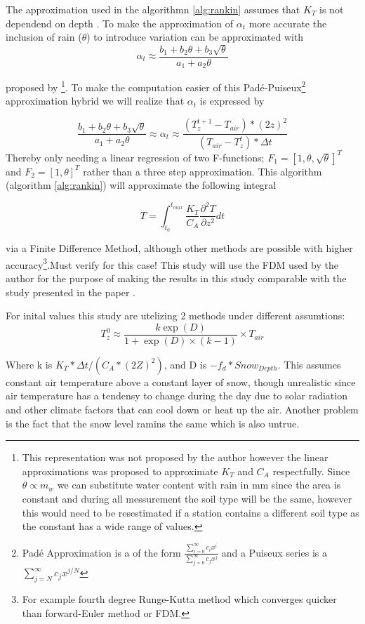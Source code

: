 The approximation used in the algorithmn \ref{alg:rankin} assumes that $K_T$ is not dependend on depth . To make the approximation of $\alpha_t$ more accurate the inclusion of rain ($\theta$) to introduce variation can be approximated with
$$
\alpha_t \approx \frac{b_1 + b_2\theta +b_3\sqrt{\theta}}{a_1 + a_2\theta}
$$

proposed by \citeauthor{kodesova_thermal_2013}\cite{kodesova_thermal_2013}\footnote{This representation was not proposed by the author however the linear approximations was proposed to approximate $K_T$ and $C_A$ respectfully. Since $\theta \propto m_w$ we can substitute water content with rain in mm since the area is constant and during all messurement the soil type will be the same, however this would need to be resestimated if a station contains a different soil type as the constant has a wide range of values\cite{kodesova_thermal_2013}.}. To make the computation easier of this Padé-Puiseux\footnote{Padé Approximation is a of the form $\frac{\sum_{i=0}^\infty c_ix^i}{\sum_{j=0}^\infty c_jx^j}$ and a Puiseux series is a $\sum_{j=N}^\infty c_jx^{j/N}$} approximation hybrid we will realize that $\alpha_t$ is expressed by

$$
	\frac{b_1 + b_2\theta +b_3\sqrt{\theta}}{a_1 + a_2\theta} \approx \alpha_t \approx \frac{(T_z^{t+1} - T_{air})*(2z)^2}{( T_{air} - T_z^{t})*\Delta t} 
$$
Thereby only needing a linear regression of two F-functions; $F_1 = [ 1,\theta ,\sqrt{\theta} ]^T$ and $F_2 = [1 , \theta]^T$ rather than a three step approximation. This algorithm (algorithm \ref{alg:rankin}) will approximate the following integral

$$
T = \int_{t_0}^{t_{max}} \frac{K_T}{C_A}\frac{\partial^2 T}{\partial z^2} dt
$$

via a Finite Difference Method, although other methods are possible with higher accuracy\footnote{For example fourth degree Runge-Kutta method\cite{runge_ueber_1895} which converges quicker than forward-Euler method or FDM.}.\alert{Must verify for this case!} This study will use the FDM used by the author for the purpose of making the results in this study comparable with the study presented in the paper . 

For inital values this study are utelizing 2 methods under different assumtions:
$$
T_z^0 \approx \frac{k\exp(D)}{1+\exp(D)\times(k-1)}\times T_{air}
$$

Where k is $ K_T*\Delta t/ (C_A * (2Z)^2)$, and D is $-f_d*Snow_{Depth}$. This assumes constant air temperature above a constant layer of snow, though unrealistic since air temperature has a tendensy to change during the day due to solar radiation and other climate factors that can cool down or heat up the air. Another problem is the fact that the snow level ramins the same which is also untrue.

